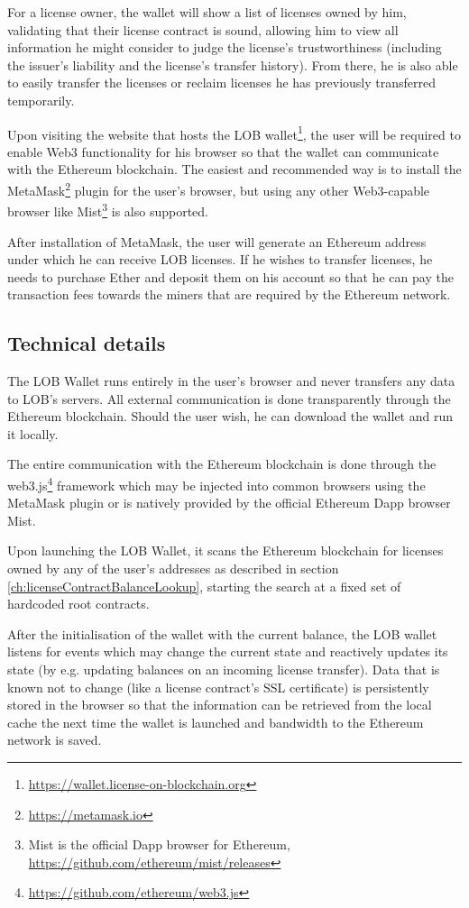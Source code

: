 \documentclass[a4paper]{article}
\begin{document}
For a license owner, the wallet will show a list of licenses owned by him, validating that their license contract is sound, allowing him to view all information he might consider to judge the license's trustworthiness (including the issuer's liability and the license's transfer history). From there, he is also able to easily transfer the licenses or reclaim licenses he has previously transferred temporarily.

Upon visiting the website that hosts the LOB wallet\footnote{\url{https://wallet.license-on-blockchain.org}}, the user will be required to enable Web3 functionality for his browser so that the wallet can communicate with the Ethereum blockchain. The easiest and recommended way is to install the MetaMask\footnote{\url{https://metamask.io}} plugin for the user's browser, but using any other Web3-capable browser like Mist\footnote{Mist is the official Dapp browser for Ethereum, \url{https://github.com/ethereum/mist/releases}} is also supported.

After installation of MetaMask, the user will generate an Ethereum address under which he can receive LOB licenses. If he wishes to transfer licenses, he needs to purchase Ether and deposit them on his account so that he can pay the transaction fees towards the miners that are required by the Ethereum network.

\subsection{Technical details}

The LOB Wallet runs entirely in the user's browser and never transfers any data to LOB's servers. All external communication is done transparently through the Ethereum blockchain. Should the user wish, he can download the wallet and run it locally.

The entire communication with the Ethereum blockchain is done through the web3.js\footnote{\url{https://github.com/ethereum/web3.js}} framework which may be injected into common browsers using the MetaMask plugin or is natively provided by the official Ethereum Dapp browser Mist.

Upon launching the LOB Wallet, it scans the Ethereum blockchain for licenses owned by any of the user's addresses as described in section \ref{ch:licenseContractBalanceLookup}, starting the search at a fixed set of hardcoded root contracts.

After the initialisation of the wallet with the current balance, the LOB wallet listens for events which may change the current state and reactively updates its state (by e.g. updating balances on an incoming license transfer). Data that is known not to change (like a license contract's SSL certificate) is persistently stored in the browser so that the information can be retrieved from the local cache the next time the wallet is launched and bandwidth to the Ethereum network is saved.
\end{document}
